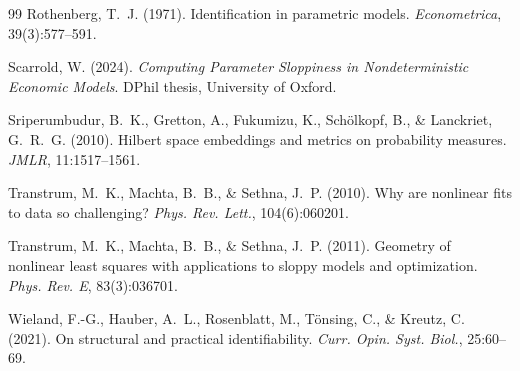 \documentclass[10pt,twocolumn]{article}
\begin{document}
{\begin{thebibliography}{99}
Rothenberg, T.~J. (1971). Identification in parametric models.
\textit{Econometrica}, 39(3):577--591.

Scarrold, W. (2024). \textit{Computing Parameter Sloppiness in Nondeterministic
Economic Models}. DPhil thesis, University of Oxford.

Sriperumbudur, B.~K., Gretton, A., Fukumizu, K., Sch\"olkopf, B., \& Lanckriet,
G.~R.~G. (2010). Hilbert space embeddings and metrics on probability measures.
\textit{JMLR}, 11:1517--1561.

Transtrum, M.~K., Machta, B.~B., \& Sethna, J.~P. (2010). Why are nonlinear fits to
data so challenging? \textit{Phys. Rev. Lett.}, 104(6):060201.

Transtrum, M.~K., Machta, B.~B., \& Sethna, J.~P. (2011). Geometry of nonlinear
least squares with applications to sloppy models and optimization.
\textit{Phys. Rev. E}, 83(3):036701.

Wieland, F.-G., Hauber, A.~L., Rosenblatt, M., T\"onsing, C., \& Kreutz, C. (2021).
On structural and practical identifiability. \textit{Curr. Opin. Syst. Biol.},
25:60--69.

\end{thebibliography}
}
\end{document}
